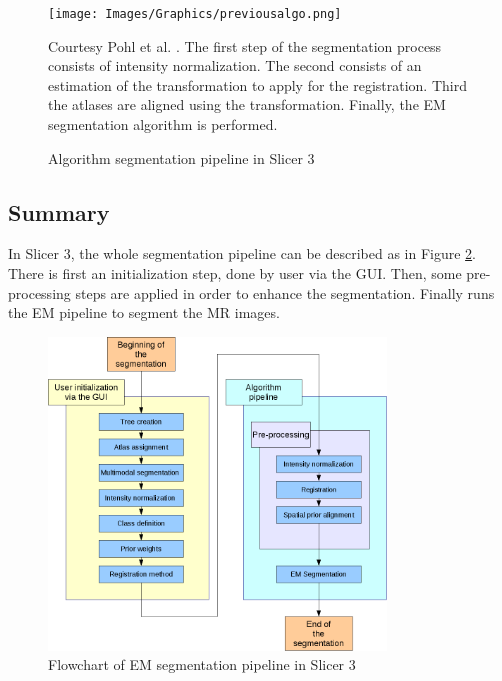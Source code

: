 \begin{itemize}
\begin{figure}[ht]\centering
  \texttt{[image: Images/Graphics/previousalgo.png]}
  \caption{Algorithm segmentation pipeline in Slicer 3}{Courtesy Pohl et al. \cite{18}. The first step of the segmentation process consists of intensity normalization. The second consists of an estimation of the transformation to apply for the registration. Third the atlases are aligned using the transformation. Finally, the EM segmentation algorithm is performed.}\label{algopipe}
  \end{figure}
  
\end{itemize}
%
\subsection{Summary}
In Slicer 3, the whole segmentation pipeline can be described as in Figure \ref{fig:Wpipeline}. There is first an initialization step, done by user via the GUI. Then, some pre-processing steps are applied in order to enhance the segmentation. Finally runs the EM pipeline to segment the MR images.

  \begin{figure}[ht]\centering
  \includegraphics[width=0.8\textwidth]{Images/Graphics/wholepipeline.png}
  \caption{Flowchart of EM segmentation pipeline in Slicer 3}\label{fig:Wpipeline}
  \end{figure}

%

